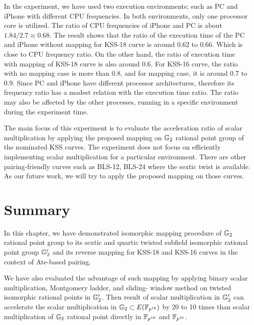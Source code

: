 In the experiment, we have used two execution environments; such as PC and iPhone with different CPU frequencies. 
In both environments, only one processor core is utilized.
The ratio of CPU frequencies of iPhone and PC is about $1.84 / 2.7 \approx 0.68$. 
The result shows that the ratio of the execution time of the PC and iPhone without mapping for KSS-18 curve is around $0.62$ to $0.66$.
Which is close to CPU frequency ratio.
On the other hand, the ratio of execution time with mapping of KSS-18 curve is also around $0.6$. 
For KSS-16 curve, the ratio with no mapping case is more than $0.8$, and for mapping case, it is around $0.7$ to $0.9$.   
Since PC and iPhone have different processor architectures, therefore its frequency ratio has a modest relation with the execution time ratio. 
The ratio may also be affected by the other processes, running in a specific environment during the experiment time.

The main focus of this experiment is to evaluate the acceleration ratio of scalar multiplication by applying the proposed mapping on ${\mathbb{G}}_{2}$ rational point group of the nominated KSS curves. The experiment does not focus on efficiently implementing scalar multiplication for a particular environment. There are other pairing-friendly curves such as BLS-12, BLS-24 \cite{JC:FreScoTes10} where the sextic twist is available. As our future work, we will try to apply the proposed mapping on those curves.


\section{Summary}
In this chapter, we have demonstrated isomorphic mapping procedure of ${\mathbb{G}}_{2}$ rational point group to its sextic and quartic twisted subfield isomorphic rational point group ${\mathbb{G}}_{2}'$  and its reverse mapping for KSS-18 and KSS-16 curves in the context of Ate-based pairing. 

We have also evaluated the advantage of such mapping by applying binary scalar multiplication, Montgomery ladder, and sliding- window method on twisted isomorphic rational points in ${\mathbb{G}}_{2}'$. 
Then result of scalar multiplication in ${\mathbb{G}}_{2}'$ can accelerate the scalar multiplication in ${\mathbb{G}}_{2} \subset E(\mathbb{F}_{p^{18}})$ by   20 to 10 times than scalar multiplication of ${\mathbb{G}}_{2}$ rational point directly in $\mathbb{F}_{p^{18}}$ and $\mathbb{F}_{p^{16}}$. 

